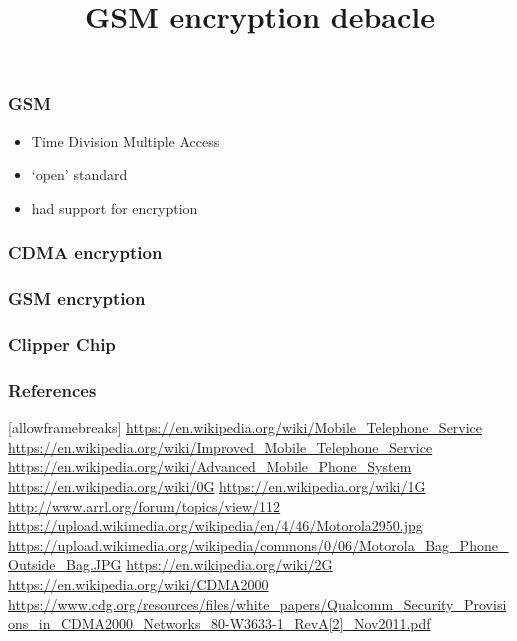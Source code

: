 \documentclass{beamer}
\begin{document}
\begin{frame}
  \frametitle{GSM}
  \begin{itemize}
    \item Time Division Multiple Access
    \item `open' standard
    \item had support for encryption
  \end{itemize}
\end{frame}

\begin{frame}
  \frametitle{CDMA encryption}
\end{frame}

\begin{frame}
  \frametitle{GSM encryption}
\end{frame}

\begin{frame}
  \title{GSM encryption debacle}
\end{frame}

\begin{frame}
  \frametitle{Clipper Chip}
\end{frame}

\begin{frame}
  \frametitle{References}[allowframebreaks]
  \url{https://en.wikipedia.org/wiki/Mobile_Telephone_Service}
  \url{https://en.wikipedia.org/wiki/Improved_Mobile_Telephone_Service}
  \url{https://en.wikipedia.org/wiki/Advanced_Mobile_Phone_System}
  \url{https://en.wikipedia.org/wiki/0G}
  \url{https://en.wikipedia.org/wiki/1G}
  \url{http://www.arrl.org/forum/topics/view/112}
  \url{https://upload.wikimedia.org/wikipedia/en/4/46/Motorola2950.jpg}
  \url{https://upload.wikimedia.org/wikipedia/commons/0/06/Motorola_Bag_Phone_Outside_Bag.JPG}
  \url{https://en.wikipedia.org/wiki/2G}
  \url{https://en.wikipedia.org/wiki/CDMA2000}
  \url{https://www.cdg.org/resources/files/white_papers/Qualcomm_Security_Provisions_in_CDMA2000_Networks_80-W3633-1_RevA[2]_Nov2011.pdf}
\end{frame}
\end{document}
